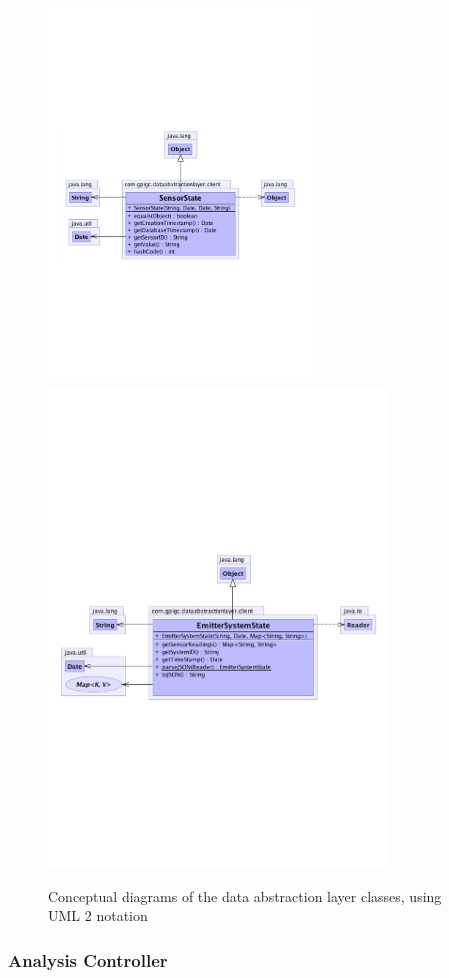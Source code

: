 \documentclass[10pt,a4paper]{article}
\begin{document}
\begin{figure}[ht!]
\includegraphics[width= 7cm]{images/DataAbstractionLayer/sensorState.pdf}
\includegraphics[width= 9cm]{images/DataAbstractionLayer/emitterSystemState.pdf}
\caption{Conceptual diagrams of the data abstraction layer classes, using UML 2 notation}
\label{fig:dataAbstractionPackage}
\end{figure}

\subsubsection{Analysis Controller}
\end{document}
